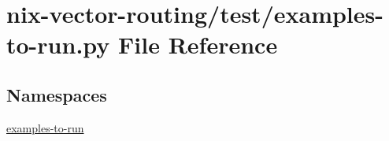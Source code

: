 \hypertarget{nix-vector-routing_2test_2examples-to-run_8py}{}\section{nix-\/vector-\/routing/test/examples-\/to-\/run.py File Reference}
\label{nix-vector-routing_2test_2examples-to-run_8py}
\subsection*{Namespaces}
\begin{DoxyCompactItemize}
\item 
 \hyperlink{namespaceexamples-to-run}{examples-\/to-\/run}
\end{DoxyCompactItemize}
